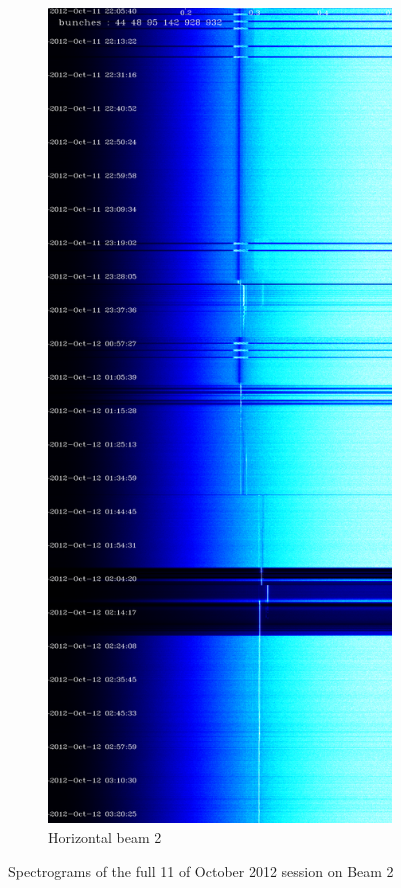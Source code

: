 \begin{figure}[H]
\begin{subfigure}{.5\textwidth}
\end{subfigure}%
\begin{subfigure}{.5\textwidth}
  \centering
  \includegraphics[width=.8\linewidth]{md-121011-hb2-bunches111111-16.png}
  \caption{Horizontal beam 2}
\end{subfigure}
\caption{Spectrograms of the full 11 of October 2012 session on Beam 2}
\end{figure}

